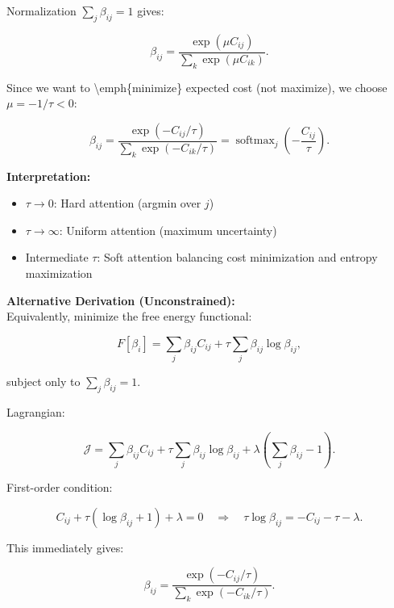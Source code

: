 \documentclass[11pt]{article}
\begin{document}
Normalization $\sum_j \beta_{ij} = 1$ gives:

\begin{equation}
\beta_{ij} = \frac{\exp(\mu C_{ij})}{\sum_k \exp(\mu C_{ik})}.
\end{equation}

Since we want to \textbackslash emph\{minimize\} expected cost (not maximize), we choose $\mu = -1/\tau < 0$:

\begin{equation}
\boxed{\beta_{ij} = \frac{\exp(-C_{ij}/\tau)}{\sum_k \exp(-C_{ik}/\tau)} = \operatorname{softmax}_j\left(-\frac{C_{ij}}{\tau}\right)}.
\end{equation}

\textbf{Interpretation:}

\begin{itemize}
  \item $\tau \to 0$: Hard attention (argmin over $j$)
  \item $\tau \to \infty$: Uniform attention (maximum uncertainty)
  \item Intermediate $\tau$: Soft attention balancing cost minimization and entropy maximization
\end{itemize}

\textbf{Alternative Derivation (Unconstrained):}\\
Equivalently, minimize the free energy functional:

\begin{equation}
F[\beta_i] = \sum_j \beta_{ij} C_{ij} + \tau \sum_j \beta_{ij}\log\beta_{ij},
\end{equation}

subject only to $\sum_j \beta_{ij} = 1$.

Lagrangian:

\begin{equation}
\mathcal{J} = \sum_j \beta_{ij} C_{ij} + \tau \sum_j \beta_{ij}\log\beta_{ij} + \lambda\left(\sum_j \beta_{ij} - 1\right).
\end{equation}

First-order condition:

\begin{equation}
C_{ij} + \tau(\log\beta_{ij} + 1) + \lambda = 0
\quad \Rightarrow \quad
\tau\log\beta_{ij} = -C_{ij} - \tau - \lambda.
\end{equation}

This immediately gives:

\begin{equation}
\beta_{ij} = \frac{\exp(-C_{ij}/\tau)}{\sum_k \exp(-C_{ik}/\tau)}.
\end{equation}
\end{document}
